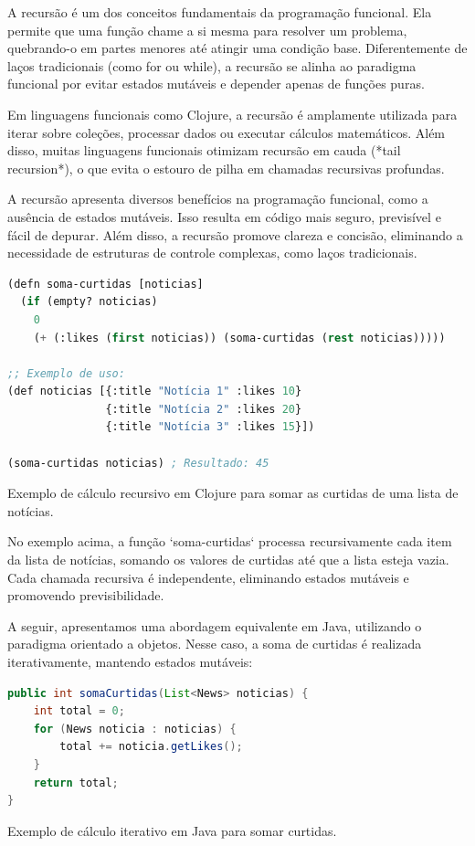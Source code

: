 A recursão é um dos conceitos fundamentais da programação funcional. Ela permite que uma função chame a si mesma para resolver um problema, quebrando-o em partes menores até atingir uma condição base. Diferentemente de laços tradicionais (como for ou while), a recursão se alinha ao paradigma funcional por evitar estados mutáveis e depender apenas de funções puras.

Em linguagens funcionais como Clojure, a recursão é amplamente utilizada para iterar sobre coleções, processar dados ou executar cálculos matemáticos. Além disso, muitas linguagens funcionais otimizam recursão em cauda (*tail recursion*), o que evita o estouro de pilha em chamadas recursivas profundas.

A recursão apresenta diversos benefícios na programação funcional, como a ausência de estados mutáveis. Isso resulta em código mais seguro, previsível e fácil de depurar. Além disso, a recursão promove clareza e concisão, eliminando a necessidade de estruturas de controle complexas, como laços tradicionais.

\begin{tcolorbox}[colback=gray!5!white, colframe=gray!75!black, title={Quadro 12 - Exemplo de Recursão em Clojure}]
\begin{lstlisting}[language=Lisp]
(defn soma-curtidas [noticias]
  (if (empty? noticias)
    0
    (+ (:likes (first noticias)) (soma-curtidas (rest noticias)))))

;; Exemplo de uso:
(def noticias [{:title "Notícia 1" :likes 10}
               {:title "Notícia 2" :likes 20}
               {:title "Notícia 3" :likes 15}])

(soma-curtidas noticias) ; Resultado: 45
\end{lstlisting}
\caption{Exemplo de cálculo recursivo em Clojure para somar as curtidas de uma lista de notícias.}
\end{tcolorbox}

No exemplo acima, a função `soma-curtidas` processa recursivamente cada item da lista de notícias, somando os valores de curtidas até que a lista esteja vazia. Cada chamada recursiva é independente, eliminando estados mutáveis e promovendo previsibilidade.

A seguir, apresentamos uma abordagem equivalente em Java, utilizando o paradigma orientado a objetos. Nesse caso, a soma de curtidas é realizada iterativamente, mantendo estados mutáveis:

\begin{tcolorbox}[colback=gray!5!white, colframe=gray!75!black, title={Quadro 13 - Exemplo Iterativo em Java}]
\begin{lstlisting}[language=Java]
public int somaCurtidas(List<News> noticias) {
    int total = 0;
    for (News noticia : noticias) {
        total += noticia.getLikes();
    }
    return total;
}
\end{lstlisting}
\caption{Exemplo de cálculo iterativo em Java para somar curtidas.}
\end{tcolorbox}

